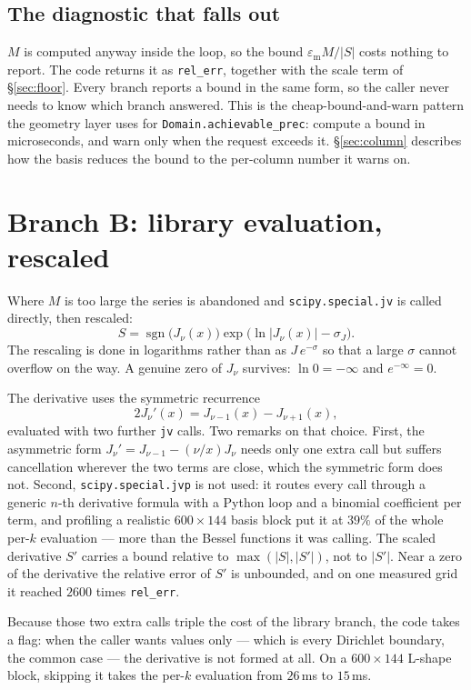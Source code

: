 \documentclass[11pt]{article}
\theoremstyle{remark}
\newcommand{\code}[1]{\texttt{#1}}
\newcommand{\eps}{\varepsilon_{\mathrm{m}}}
\DeclareMathOperator{\sgn}{sgn}
\begin{document}
\subsection{The diagnostic that falls out}

$M$ is computed anyway inside the loop, so the bound $\eps M/|S|$ costs nothing to report.
The code returns it as \code{rel\_err}, together with the scale term of
\S\ref{sec:floor}. Every branch reports a bound in the same form, so the caller never needs to
know which branch answered. This is the cheap-bound-and-warn pattern the geometry layer uses
for \code{Domain.achievable\_prec}: compute a bound in microseconds, and warn only when the
request exceeds it. \S\ref{sec:column} describes how the basis reduces the bound to the
per-column number it warns on.

\section{Branch B: library evaluation, rescaled}

Where $M$ is too large the series is abandoned and \code{scipy.special.jv} is called
directly, then rescaled:
\[
  S=\sgn\big(J_\nu(x)\big)\exp\!\big(\ln|J_\nu(x)|-\sigma_J\big).
\]
The rescaling is done in logarithms rather than as $J\,e^{-\sigma}$ so that a large $\sigma$
cannot overflow on the way. A genuine zero of $J_\nu$ survives: $\ln 0=-\infty$ and
$e^{-\infty}=0$.

The derivative uses the symmetric recurrence
\[
  2J_\nu'(x)=J_{\nu-1}(x)-J_{\nu+1}(x),
\]
evaluated with two further \code{jv} calls. Two remarks on that choice. First, the
asymmetric form $J_\nu'=J_{\nu-1}-(\nu/x)J_\nu$ needs only one extra call but suffers
cancellation wherever the two terms are close, which the symmetric form does not. Second,
\code{scipy.special.jvp} is not used: it routes every call through a generic $n$-th
derivative formula with a Python loop and a binomial coefficient per term, and profiling a
realistic $600\times144$ basis block put it at $39\%$ of the whole per-$k$ evaluation ---
more than the Bessel functions it was calling. The scaled derivative $S'$ carries a bound
relative to $\max(|S|,|S'|)$, not to $|S'|$. Near a zero of the derivative the relative error
of $S'$ is unbounded, and on one measured grid it reached $2600$ times \code{rel\_err}.

Because those two extra calls triple the cost of the library branch, the code takes a flag:
when the caller wants values only --- which is every Dirichlet boundary, the common case ---
the derivative is not formed at all. On a $600\times144$ L-shape block, skipping it takes
the per-$k$ evaluation from $26$\,ms to $15$\,ms.
\end{document}
